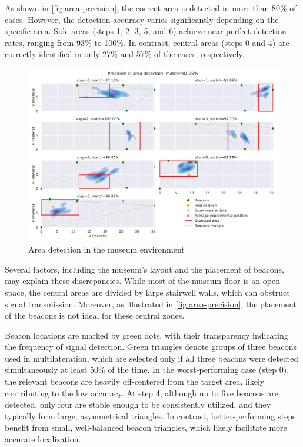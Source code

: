 As shown in \autoref{fig:area-precision}, the correct area is detected in more than 80\% of cases. However, the detection accuracy varies significantly depending on the specific area. Side areas (steps 1, 2, 3, 5, and 6) achieve near-perfect detection rates, ranging from 93\% to 100\%. In contrast, central areas (steps 0 and 4) are correctly identified in only 27\% and 57\% of the cases, respectively.

\begin{figure}[h]
		\centering
		\includegraphics[width=\linewidth]{assets/museum-area-precision.pdf}
		\caption{Area detection in the museum environment}
		\label{fig:area-precision}
\end{figure}

    Several factors, including the museum's layout and the placement of beacons, may explain these discrepancies. While most of the museum floor is an open space, the central areas are divided by large stairwell walls, which can obstruct signal transmission. Moreover, as illustrated in \autoref{fig:area-precision}, the placement of the beacons is not ideal for these central zones. 

    Beacon locations are marked by green dots, with their transparency indicating the frequency of signal detection. Green triangles denote groups of three beacons used in multilateration, which are selected only if all three beacons were detected simultaneously at least 50\% of the time. In the worst-performing case (step 0), the relevant beacons are heavily off-centered from the target area, likely contributing to the low accuracy. At step 4, although up to five beacons are detected, only four are stable enough to be consistently utilized, and they typically form large, asymmetrical triangles. In contrast, better-performing steps benefit from small, well-balanced beacon triangles, which likely facilitate more accurate localization. 
     
